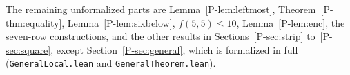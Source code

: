\documentclass[12pt]{article}
\theoremstyle{plain}
\begin{document}
The remaining unformalized parts are Lemma~\ref{P-lem:leftmost},
Theorem~\ref{P-thm:equality}, Lemma~\ref{P-lem:sixbelow}, $f(5,5)\le10$,
Lemma~\ref{P-lem:enc}, the seven-row constructions, and the other results in
Sections~\ref{P-sec:strip} to~\ref{P-sec:square}, except Section~\ref{P-sec:general}, which is
formalized in full (\nolinkurl{GeneralLocal.lean} and \nolinkurl{GeneralTheorem.lean}).
\end{document}

